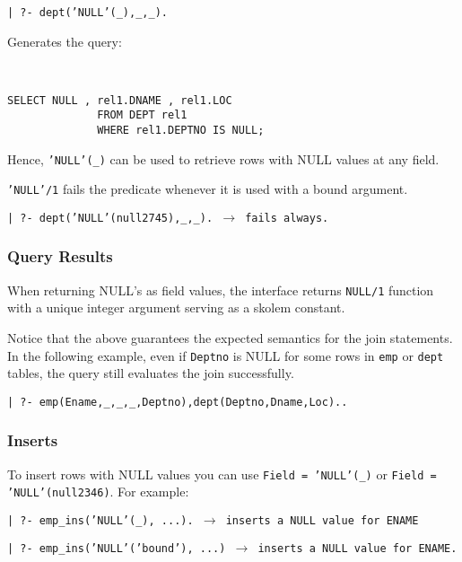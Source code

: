 \begin{center}

{\tt | ?- dept('NULL'(\_),\_,\_).}
\end{center}

Generates the query: 


\begin{verbatim}


SELECT NULL , rel1.DNAME , rel1.LOC
			  FROM DEPT rel1
			  WHERE rel1.DEPTNO IS NULL;
\end{verbatim}

Hence, {\tt 'NULL'(\_)} can be used to retrieve rows with NULL values 
at any field.

{\tt 'NULL'/1} fails the predicate whenever it is
used with a bound argument.
\begin{center}

{\tt | ?- dept('NULL'(null2745),\_,\_). $\rightarrow$ fails always.}
\end{center}


\subsubsection{Query Results}
When returning NULL's as field values, the interface returns {\tt NULL/1} 
function with a unique integer argument serving as a skolem constant.

Notice that the above guarantees the expected semantics for the join 
statements.  In the following example, even if {\tt Deptno} is NULL for some rows in {\tt emp} or {\tt dept} tables, the query still evaluates the join successfully.
\begin{center}

{\tt | ?- emp(Ename,\_,\_,\_,Deptno),dept(Deptno,Dname,Loc)..}
\end{center}

\subsubsection{Inserts}

To insert rows with NULL values you can use {\tt Field = 'NULL'(\_)} or
{\tt Field = 'NULL'(null2346)}.  For example:

\begin{center}

{\tt | ?- emp\_ins('NULL'(\_), ...).  $\rightarrow$ inserts a NULL value for ENAME}
\end{center}
\begin{center}

{\tt | ?- emp\_ins('NULL'('bound'), ...) $\rightarrow$ inserts a NULL value for ENAME.}

\end{center}



